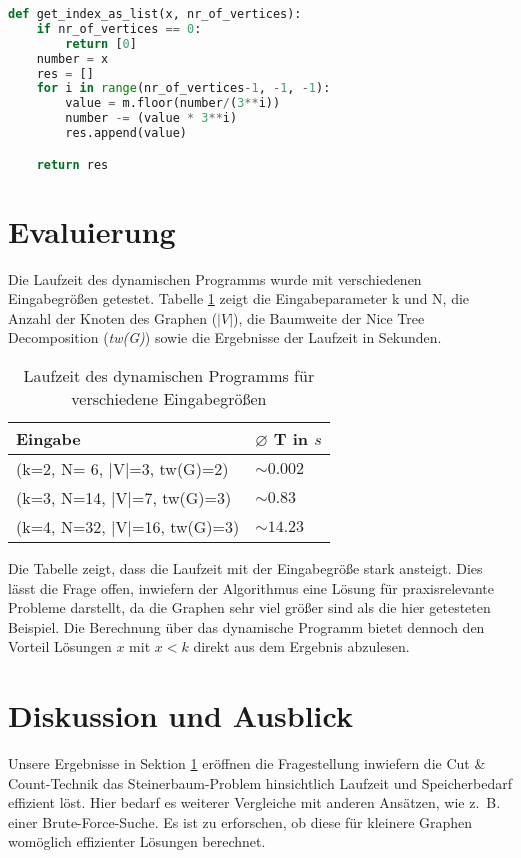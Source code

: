 \begin{svgraybox}
\begin{lstlisting}[language=python,label={code:as_list}, basicstyle=\small, caption=Funktion get\_index\_as\_list zur Berechnung der ternären Färbung aus dem Index]
def get_index_as_list(x, nr_of_vertices):
    if nr_of_vertices == 0:
        return [0]
    number = x
    res = []
    for i in range(nr_of_vertices-1, -1, -1):
        value = m.floor(number/(3**i))
        number -= (value * 3**i)
        res.append(value)

    return res
\end{lstlisting}
\end{svgraybox}

\section{Evaluierung}
\label{sec:impl_eval}
Die Laufzeit des dynamischen Programms wurde mit verschiedenen Eingabegrößen getestet. Tabelle \ref{t:eval} zeigt die Eingabeparameter k und N, die Anzahl der Knoten des Graphen ($|V|$), die Baumweite der Nice Tree Decomposition (\textit{tw(G)}) sowie die Ergebnisse der Laufzeit in Sekunden.
\begin{table}
\centering
\begin{tabular}{l | l} 
\textbf{Eingabe} & \textbf{ $\varnothing$ T in $s$}\\
\hline
(k=2, N= 6, |V|=3, tw(G)=2) & $ \sim 0.002$ \\
(k=3, N=14, |V|=7, tw(G)=3) & $ \sim 0.83$ \\
(k=4, N=32, |V|=16, tw(G)=3) & $ \sim 14.23$ \\
\end{tabular}
\caption{Laufzeit des dynamischen Programms für verschiedene Eingabegrößen}
\label{t:eval}
\end{table}

Die Tabelle zeigt, dass die Laufzeit mit der Eingabegröße stark ansteigt. Dies lässt die Frage offen, inwiefern der Algorithmus eine Lösung für praxisrelevante Probleme darstellt, da die Graphen sehr viel größer sind als die hier getesteten Beispiel. 
Die Berechnung über das dynamische Programm bietet dennoch den Vorteil Lösungen $x$ mit $x<k$ direkt aus dem Ergebnis abzulesen.

\section{Diskussion und Ausblick}
\label{sec:impl_outlook}
Unsere Ergebnisse in Sektion \ref{sec:impl_eval} eröffnen die Fragestellung inwiefern die Cut \& Count-Technik das Steinerbaum-Problem hinsichtlich Laufzeit und Speicherbedarf effizient löst. 
Hier bedarf es weiterer Vergleiche mit anderen Ansätzen, wie z.~B. einer Brute-Force-Suche. Es ist zu erforschen, ob diese für kleinere Graphen womöglich effizienter Lösungen berechnet.

